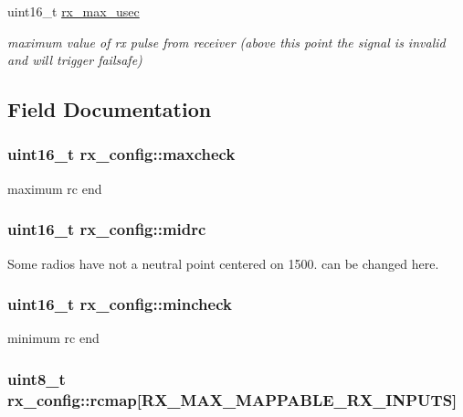 \begin{DoxyCompactItemize}
uint16\+\_\+t \hyperlink{structrx__config_a96854d89202e04fd984d0f561dbea7e4}{rx\+\_\+max\+\_\+usec}
\begin{DoxyCompactList}\small\item\em maximum value of rx pulse from receiver (above this point the signal is invalid and will trigger failsafe) \end{DoxyCompactList}\end{DoxyCompactItemize}


\subsection{Field Documentation}
\hypertarget{structrx__config_a55f92cef1541599a3a0ded8524ecba74}{
\subsubsection[{maxcheck}]{\setlength{\rightskip}{0pt plus 5cm}uint16\+\_\+t rx\+\_\+config\+::maxcheck}}\label{structrx__config_a55f92cef1541599a3a0ded8524ecba74}


maximum rc end 

\hypertarget{structrx__config_a68cff5e9b0d5293c363a2b596f45d8c7}{
\subsubsection[{midrc}]{\setlength{\rightskip}{0pt plus 5cm}uint16\+\_\+t rx\+\_\+config\+::midrc}}\label{structrx__config_a68cff5e9b0d5293c363a2b596f45d8c7}


Some radios have not a neutral point centered on 1500. can be changed here. 

\hypertarget{structrx__config_aec056aabcb236e2a86679cd296047fb1}{
\subsubsection[{mincheck}]{\setlength{\rightskip}{0pt plus 5cm}uint16\+\_\+t rx\+\_\+config\+::mincheck}}\label{structrx__config_aec056aabcb236e2a86679cd296047fb1}


minimum rc end 

\hypertarget{structrx__config_a466e723fab37f8cd2903d5ff8ee6e751}{
\subsubsection[{rcmap}]{\setlength{\rightskip}{0pt plus 5cm}uint8\+\_\+t rx\+\_\+config\+::rcmap\mbox{[}{\bf R\+X\+\_\+\+M\+A\+X\+\_\+\+M\+A\+P\+P\+A\+B\+L\+E\+\_\+\+R\+X\+\_\+\+I\+N\+P\+U\+T\+S}\mbox{]}}}\label{structrx__config_a466e723fab37f8cd2903d5ff8ee6e751}


